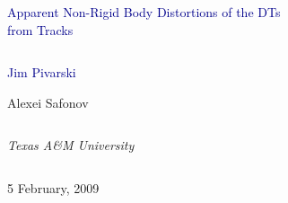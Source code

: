 \documentclass[compress]{beamer}
\begin{document}
\begin{frame}
\vfill
\begin{center}
\textcolor{darkblue}{\Large Apparent Non-Rigid Body Distortions of the DTs \\ \vspace{0.2 cm} from Tracks}

\vfill
\begin{columns}
\begin{center}
\large
\textcolor{darkblue}{Jim Pivarski}

\vspace{0.2 cm}
Alexei Safonov
\end{center}
\end{columns}

\begin{columns}
\begin{center}
\scriptsize
{\it Texas A\&M University}
\end{center}
\end{columns}

\vfill
 5 February, 2009

\end{center}
\end{frame}


\small
\end{document}
